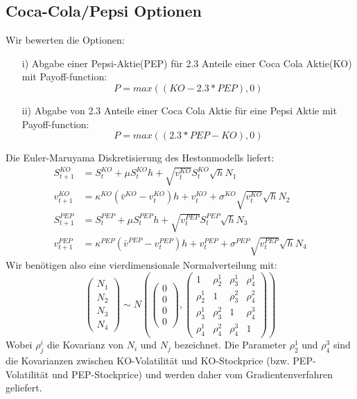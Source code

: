 \documentclass[a4paper,12pt]{article}
\numberwithin[\arabic]{Satz}{section}
\begin{document}
	\subsection*{Coca-Cola/Pepsi Optionen}
		Wir bewerten die Optionen: 
		\begin{itemize}
			\item[i)] Abgabe einer Pepsi-Aktie(PEP) für 2.3 Anteile einer Coca Cola Aktie(KO) mit Payoff-function:
				\begin{equation*}
				P=max((KO-2.3*PEP),0)
				\end{equation*}			
			\item[ii)] Abgabe von 2.3 Anteile einer Coca Cola Aktie für eine Pepsi Aktie mit Payoff-function:
			\begin{equation*}
			P=max((2.3*PEP-KO),0)
			\end{equation*}			
		\end{itemize}
		Die Euler-Maruyama Diskretisierung des Hestonmodells liefert:
		\begin{align*}
		S^{KO}_{t+1}&=S^{KO}_{t}+\mu S^{KO}_{t}h+\sqrt{v^{KO}_t}S^{KO}_{t}\sqrt{h}N_1\\
		v^{KO}_{t+1}&=\kappa^{KO}(\bar{v}^{KO}-v^{KO}_t)h+v^{KO}_t+\sigma^{KO}\sqrt{v^{KO}_t}\sqrt{h}N_2\\
		S^{PEP}_{t+1}&=S^{PEP}_{t}+\mu S^{PEP}_{t}h+\sqrt{v^{PEP}_t}S^{PEP}_{t}\sqrt{h}N_3\\
		v^{PEP}_{t+1}&=\kappa^{PEP}(\bar{v}^{PEP}-v^{PEP}_t)h+v^{PEP}_t+\sigma^{PEP}\sqrt{v^{PEP}_t}\sqrt{h}N_4
		\end{align*}
		Wir benötigen also eine vierdimensionale Normalverteilung mit:
		\begin{equation*}
		\left({\begin{array}{c} N_1\\ N_2\\ N_3\\ N_4\end{array}}\right) \sim N\left(\left({\begin{array}{c} 0 \\ 0 \\ 0 \\ 0 \end{array}}\right),\left({\begin{array}{cccc} 1 & \rho^1_2 & \rho^1_3 & \rho^1_4\\ \rho^1_2 & 1 & \rho^2_3 & \rho^2_4 \\ \rho^1_3 & \rho^2_3 & 1 & \rho^3_4 \\ \rho^1_4 & \rho^2_4 & \rho^3_4 & 1 \end{array}}\right)\right)
		\end{equation*}
		Wobei $\rho^{i}_j$ die Kovarianz von $N_i$ und $N_j$ bezeichnet.
		Die Parameter $\rho^1_2$ und $\rho^3_4$ sind die Kovarianzen zwischen KO-Volatilität und KO-Stockprice (bzw. PEP-Volatilität und PEP-Stockprice) und werden daher vom Gradientenverfahren geliefert. 
		
\end{document}
